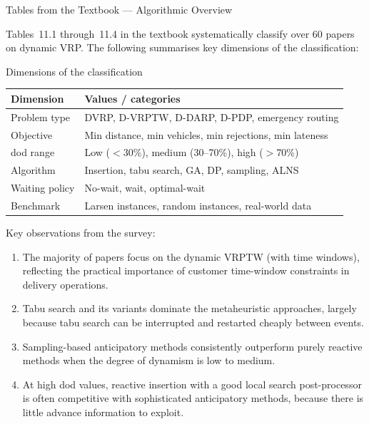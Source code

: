 \documentclass[aspectratio=169,10pt]{beamer}
\begin{document}
\begin{frame}[allowframebreaks]{Tables from the Textbook — Algorithmic Overview}

  Tables~11.1 through~11.4 in the textbook systematically classify over
  60 papers on dynamic VRP.  The following summarises key dimensions of the
  classification:

  \begin{block}{Dimensions of the classification}
    \begin{tabular}{p{3.5cm}p{10cm}}
      \toprule
      Dimension & Values / categories\\
      \midrule
      Problem type & DVRP, D-VRPTW, D-DARP, D-PDP, emergency routing\\
      Objective     & Min distance, min vehicles, min rejections, min lateness\\
      dod range     & Low (${<}$30\%), medium (30--70\%), high (${>}$70\%)\\
      Algorithm     & Insertion, tabu search, GA, DP, sampling, ALNS\\
      Waiting policy & No-wait, wait, optimal-wait\\
      Benchmark     & Larsen instances, random instances, real-world data\\
      \bottomrule
    \end{tabular}
  \end{block}

  \medskip
  Key observations from the survey:
  \begin{enumerate}
    \item The majority of papers focus on the dynamic VRPTW (with time windows),
          reflecting the practical importance of customer time-window constraints
          in delivery operations.
    \item Tabu search and its variants dominate the metaheuristic approaches,
          largely because tabu search can be interrupted and restarted cheaply
          between events.
    \item Sampling-based anticipatory methods consistently outperform purely
          reactive methods when the degree of dynamism is low to medium.
    \item At high dod values, reactive insertion with a good local search
          post-processor is often competitive with sophisticated anticipatory
          methods, because there is little advance information to exploit.
  \end{enumerate}

\end{frame}
\end{document}
